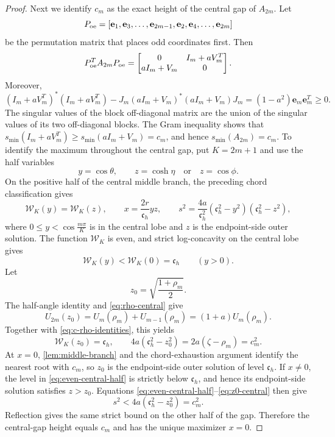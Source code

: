 \documentclass[a4paper,preprint,12pt,nopreprintline,sort&compress]{elsarticle}
\numberwithin{equation}{section}
\theoremstyle{remark}
\begin{document}
\begin{proof}
Next we identify \(c_m\) as the exact height of the central gap of
\(A_{2m}\).  Let
\[
 P_{\rm oe}=[\mathbf e_1,\mathbf e_3,\ldots,\mathbf e_{2m-1},
 \mathbf e_2,\mathbf e_4,\ldots,\mathbf e_{2m}]
\]
be the permutation matrix that places odd coordinates first.  Then
\[
 P_{\rm oe}^T A_{2m}P_{\rm oe}=
 \begin{bmatrix}0&I_m+aV_m^T\\aI_m+V_m&0\end{bmatrix}.
\]
Moreover,
\[
 (I_m+aV_m^T)^*(I_m+aV_m^T)
 -J_m(aI_m+V_m)^*(aI_m+V_m)J_m
 =(1-a^2)\mathbf e_m\mathbf e_m^T\geq0.
\]
The singular values of the block off-diagonal matrix are the union of
the singular values of its two off-diagonal blocks.  The Gram
inequality shows that
\(s_{\min}(I_m+aV_m^T)\geq s_{\min}(aI_m+V_m)=c_m\), and hence
\(s_{\min}(A_{2m})=c_m\).  To identify the maximum throughout the central
gap, put \(K=2m+1\) and use the half
variables
\[
 y=\cos\theta,\qquad
 z=\cosh\eta\quad\text{or}\quad z=\cos\phi.
\]
On the positive half of the central middle branch, the preceding chord
classification gives
\begin{equation}\label{eq:even-central-half}
 \mathcal W_K(y)=\mathcal W_K(z),\qquad
 x=\frac{2r}{\mathfrak c_h}yz,\qquad
 s^2=\frac{4a}{\mathfrak c_h^2}
 (\mathfrak c_h^2-y^2)(\mathfrak c_h^2-z^2),
\end{equation}
where \(0\leq y<\cos\frac{m\pi}{K}\) is in the central lobe and
\(z\) is the
endpoint-side outer solution.  The function \(\mathcal W_K\) is even,
and strict log-concavity on the central lobe gives
\[
 \mathcal W_K(y)<\mathcal W_K(0)=\mathfrak c_h\qquad(y>0).
\]
Let
\[
 z_0=\sqrt{\frac{1+\rho_m}{2}}.
\]
The half-angle identity and \eqref{eq:rho-central} give
\[
 U_{2m}(z_0)=U_m(\rho_m)+U_{m-1}(\rho_m)
 =(1+a)U_m(\rho_m).
\]
Together with \eqref{eq:c-rho-identities}, this yields
\begin{equation}\label{eq:z0-central}
 \mathcal W_K(z_0)=\mathfrak c_h,\qquad
 4a(\mathfrak c_h^2-z_0^2)=2a(\zeta-\rho_m)=c_m^2.
\end{equation}
At \(x=0\), \cref{lem:middle-branch} and the chord-exhaustion argument
identify the nearest root with \(c_m\), so \(z_0\) is the endpoint-side
outer solution of level \(\mathfrak c_h\).  If \(x\neq0\), the level
in \eqref{eq:even-central-half} is strictly below \(\mathfrak c_h\), and hence its
endpoint-side solution satisfies \(z>z_0\).  Equations
\eqref{eq:even-central-half}--\eqref{eq:z0-central} then give
\[
 s^2<4a(\mathfrak c_h^2-z_0^2)=c_m^2.
\]
Reflection gives the same strict bound on the other half of the gap.
Therefore the central-gap height equals \(c_m\) and has the unique maximizer
\(x=0\).


\end{proof}
\end{document}

